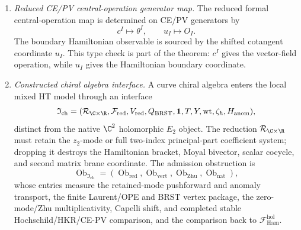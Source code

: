 \begin{enumerate}
  \item \emph{Reduced CE/PV central-operation generator map.}
  The reduced formal central-operation map is determined on CE/PV
  generators by
  \[
    c^I\mapsto\theta^I,\qquad u_I\mapsto O_I .
  \]
  The boundary Hamiltonian observable is sourced by the shifted
  cotangent coordinate \(u_I\).  This type check is part of the theorem:
  \(c^I\) gives the vector-field operation, while \(u_I\) gives the
  Hamiltonian boundary coordinate.

  \item \emph{Constructed chiral algebra interface.}
  A curve chiral algebra enters the local mixed HT model through an
  interface
  \[
    \mathfrak I_{\mathrm{ch}}
    =
    (\mathcal R_{\C\times\R},
     \mathcal F_{\mathrm{red}},
     V_{\mathrm{red}},
     Q_{\mathrm{BRST}},
     \mathbf 1,T,Y,\operatorname{wt},
     \zeta_\hbar,H_{\mathrm{anom}}),
  \]
  distinct from the native \(\C^2\) holomorphic \(E_2\) object.  The
  reduction \(\mathcal R_{\C\times\R}\) must retain the \(z_2\)-mode
  or full two-index principal-part coefficient system; dropping it
  destroys the Hamiltonian bracket, Moyal bivector, scalar cocycle,
  and second matrix brane coordinate.  The admission obstruction is
  \[
    \operatorname{Ob}_{\mathfrak I_{\mathrm{ch}}}
    =
    (\operatorname{Ob}_{\mathrm{red}},
     \operatorname{Ob}_{\mathrm{vert}},
     \operatorname{Ob}_{\mathrm{Zhu}},
     \operatorname{Ob}_{\mathrm{nat}}),
  \]
  whose entries measure the retained-mode pushforward and anomaly
  transport, the finite Laurent/OPE and BRST vertex package, the
  zero-mode/Zhu multiplicativity, Capelli shift, and completed stable
  Hochschild/HKR/CE-PV comparison, and the comparison back to
  \(\mathcal F_{\mathrm{Ham}}^{\mathrm{hol}}\).


\end{enumerate}
